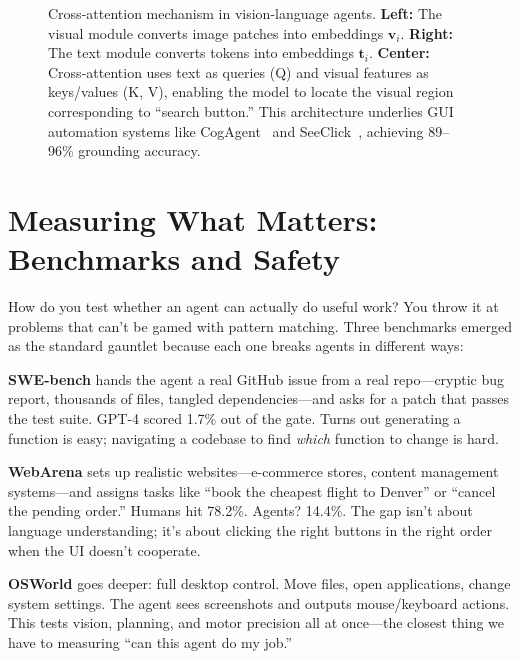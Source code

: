 \documentclass[12pt,a4paper]{report}
\theoremstyle{definition}
\begin{document}
\begin{figure}[h]
\begin{tikzpicture}[scale=0.8, transform shape]
\end{tikzpicture}
\caption{Cross-attention mechanism in vision-language agents. \textbf{Left:} The visual module converts image patches into embeddings $\mathbf{v}_i$. \textbf{Right:} The text module converts tokens into embeddings $\mathbf{t}_i$.
 \textbf{Center:} Cross-attention uses text as queries (Q) and visual features as keys/values (K, V), enabling the model to locate the visual region corresponding to ``search button.'' This architecture underlies GUI automation systems like CogAgent~\cite{hong2023cogagent} and SeeClick~\cite{cheng2024seeclick}, achieving 89--96\% grounding accuracy.}
\label{fig:cross-attention-mechanism}
\end{figure}

\section{Measuring What Matters: Benchmarks and Safety}
\label{sec:eval_safety}

How do you test whether an agent can actually do useful work? You throw it at problems that can't be gamed with pattern matching. Three benchmarks emerged as the standard gauntlet because each one breaks agents in different ways:

\textbf{SWE-bench} \cite{jimenez2024swebench} hands the agent a real GitHub issue from a real repo---cryptic bug report, thousands of files, tangled dependencies---and asks for a patch that passes the test suite. GPT-4 scored 1.7\% out of the gate. Turns out generating a function is easy; navigating a codebase to find \textit{which} function to change is hard.

\textbf{WebArena} \cite{zhou2024webarena} sets up realistic websites---e-commerce stores, content management systems---and assigns tasks like ``book the cheapest flight to Denver'' or ``cancel the pending order.'' Humans hit 78.2\%. Agents? 14.4\%. The gap isn't about language understanding; it's about clicking the right buttons in the right order when the UI doesn't cooperate.

\textbf{OSWorld} \cite{xie2024osworld} goes deeper: full desktop control. Move files, open applications, change system settings. The agent sees screenshots and outputs mouse/keyboard actions. This tests vision, planning, and motor precision all at once---the closest thing we have to measuring ``can this agent do my job.''
\end{document}
